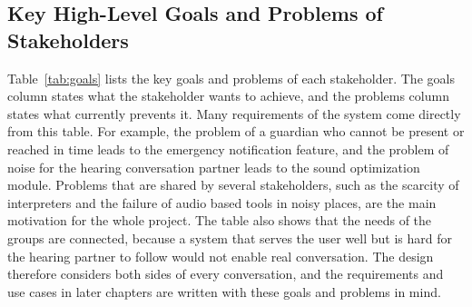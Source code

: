 \documentclass{FastFyp}
\begin{document}
\subsection{Key High-Level Goals and Problems of Stakeholders}
Table~\ref{tab:goals} lists the key goals and problems of each stakeholder. The goals column states what the stakeholder wants to achieve, and the problems column states what currently prevents it. Many requirements of the system come directly from this table. For example, the problem of a guardian who cannot be present or reached in time leads to the emergency notification feature, and the problem of noise for the hearing conversation partner leads to the sound optimization module. Problems that are shared by several stakeholders, such as the scarcity of interpreters and the failure of audio based tools in noisy places, are the main motivation for the whole project. The table also shows that the needs of the groups are connected, because a system that serves the user well but is hard for the hearing partner to follow would not enable real conversation. The design therefore considers both sides of every conversation, and the requirements and use cases in later chapters are written with these goals and problems in mind.
\end{document}
